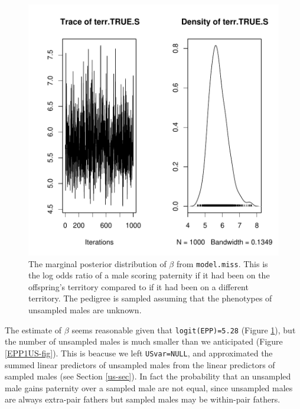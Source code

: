 \documentclass{article}
\begin{document}
\begin{figure}[!h]
\begin{center}
\includegraphics{Tutorial-068}
\end{center}
\caption{The marginal posterior distribution of $\beta$ from \texttt{model.miss}.  This is the log odds ratio of a male scoring paternity if it had been on the offspring's territory compared to if it had been on a different territory. The pedigree is sampled assuming that the phenotypes of unsampled males are unknown.}
\label{EPP1-fig}
\end{figure}


The estimate of $\beta$ seems reasonable given that \texttt{logit(EPP)=5.28} (Figure \ref{EPP1-fig}), but the number of unsampled males is much smaller than we anticipated (Figure \ref{EPP1US-fig}).  This is beacuse we left \texttt{USvar=NULL}, and approximated the summed linear predictors of unsampled males from the linear predictors of sampled males (see Section \ref{us-sec}).  In fact the probability that an unsampled male gains paternity over a sampled male are not equal, since unsampled males are always extra-pair fathers but sampled males may be within-pair fathers.\\  
\end{document}
